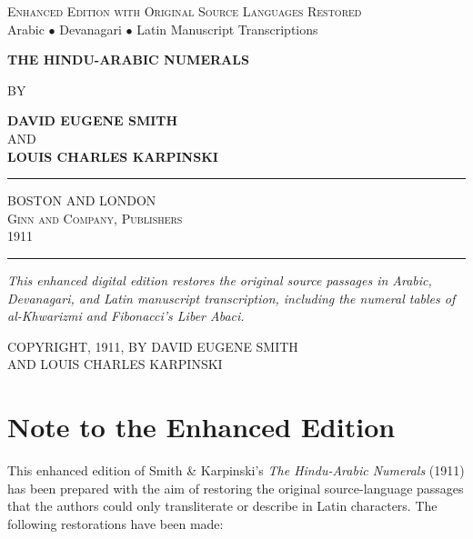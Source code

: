 \documentclass[11pt,a4paper]{article}
\newcommand{\shortline}{\noindent\rule{0.5\textwidth}{0.4pt}\par}
\begin{document}
\thispagestyle{empty}
\begin{center}
\vspace*{1.5cm}
{\small\textsc{Enhanced Edition with Original Source Languages Restored}}\\[0.3cm]
{\footnotesize Arabic $\bullet$ Devanagari $\bullet$ Latin Manuscript Transcriptions}

\vspace{1cm}
{\Huge\bfseries\color{titlecolor} THE HINDU-ARABIC NUMERALS}

\vspace{1.2cm}
{\large BY}
\vspace{0.4cm}

{\LARGE\bfseries DAVID EUGENE SMITH}\\[0.25cm]
{\large AND}\\[0.25cm]
{\LARGE\bfseries LOUIS CHARLES KARPINSKI}

\vspace{1.5cm}
\shortline
\vspace{0.4cm}

{\large BOSTON AND LONDON}\\[0.15cm]
{\large\scshape Ginn and Company, Publishers}\\[0.2cm]
{\large 1911}

\vspace{0.8cm}
\shortline
\vspace{0.8cm}

\begin{minipage}{0.85\textwidth}
\centering
\small
\textit{This enhanced digital edition restores the original source passages
in Arabic, Devanagari, and Latin manuscript
transcription, including the numeral tables of al-Khwarizmi and
Fibonacci's Liber Abaci.}
\end{minipage}

\vfill
{\small COPYRIGHT, 1911, BY DAVID EUGENE SMITH}\\[0.1cm]
{\small AND LOUIS CHARLES KARPINSKI}
\vspace{0.8cm}
\end{center}
\newpage

\section*{Note to the Enhanced Edition}

This enhanced edition of Smith \& Karpinski's \textit{The Hindu-Arabic Numerals} (1911) has been prepared with the aim of restoring the original source-language passages that the authors could only transliterate or describe in Latin characters. The following restorations have been made:
\end{document}
